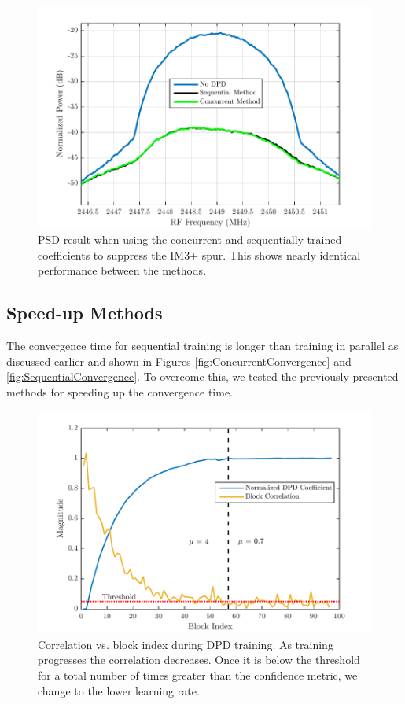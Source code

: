 \begin{figure}[t!] 
	\centering
	\includegraphics[width=0.9\columnwidth]{IterativeSpectrumvsConcurrent}
	\caption{PSD result when using the concurrent and sequentially trained coefficients to suppress the IM3+ spur. 
		This shows nearly identical performance between the methods.}
	\label{fig:IterativeSpectrumvsConcurrent}
\end{figure}

\subsection{Speed-up Methods}
The convergence time for sequential training is longer than training in parallel as discussed earlier and shown in Figures \ref{fig:ConcurrentConvergence} and \ref{fig:SequentialConvergence}. 
To overcome this, we tested the previously presented methods for speeding up the convergence time.

\begin{figure}[t] 
	\centering
	\includegraphics[width=0.9\columnwidth]{Convergence_Mu}
	\caption{Correlation vs. block index during DPD training. 
		As training progresses the correlation decreases. 
		Once it is below the threshold for a total number of times greater than the confidence metric, we change to the lower learning rate.}
	\label{fig:Convergence_Mu}
\end{figure}


